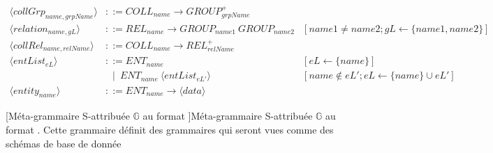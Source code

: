 \begin{landscape}
\begin{adjustbox}{max width=\linewidth,max height=.95\textheight,valign=c}
{\begin{align}
                \langle collGrp_{name,grpName} \rangle      & ::= COLL_{name} \to GROUP_{grpName}^+                                                                                                                                                                                                  \\[1em]
                \langle relation_{name, gL} \rangle         & ::= REL_{name} \to GROUP_{name1} ~ GROUP_{name2}                                                             & [name1 \neq name2; gL \gets \{name1, name2\}]                                                                           \\
                \langle collRel_{name,relName} \rangle      & ::= COLL_{name} \to REL_{relName}^+                                                                                                                                                                                                    \\[1em]
                \langle entList_{eL} \rangle                & ::= ENT_{name}                                                                                               & [eL \gets \{name\}]                                                                                                     \\
                                                            & ~~ \mid ~ ENT_{name} ~ \langle entList_{eL'} \rangle                                                         & [name \notin eL'; eL \gets \{name\} \cup eL']                                                                           \\
                \langle entity_{name} \rangle               & ::= ENT_{name} \to \langle data \rangle
            \end{align}}
    \end{adjustbox}
    [Méta-grammaire S-attribuée $\mathbb{G}$ au format ]{Méta-grammaire S-attribuée $\mathbb{G}$ au format . Cette grammaire définit des grammaires qui seront vues comme des schémas de base de donnée \label{table:struct:meta}}
\end{landscape}

